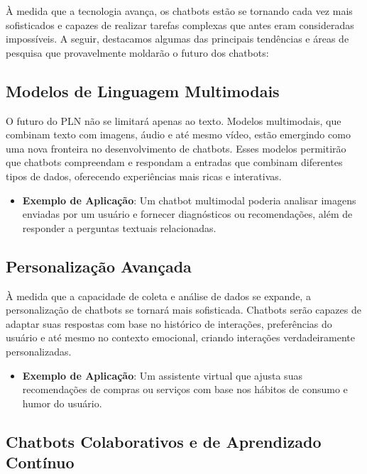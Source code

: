\documentclass[14pt,a4paper,oneside]{book}
\begin{document}
À medida que a tecnologia avança, os chatbots estão se tornando cada vez mais sofisticados e capazes de realizar tarefas complexas que antes eram consideradas impossíveis. A seguir, destacamos algumas das principais tendências e áreas de pesquisa que provavelmente moldarão o futuro dos chatbots:

\subsection{Modelos de Linguagem Multimodais}

O futuro do PLN não se limitará apenas ao texto. Modelos multimodais, que combinam texto com imagens, áudio e até mesmo vídeo, estão emergindo como uma nova fronteira no desenvolvimento de chatbots. Esses modelos permitirão que chatbots compreendam e respondam a entradas que combinam diferentes tipos de dados, oferecendo experiências mais ricas e interativas.

\begin{itemize}
	\item \textbf{Exemplo de Aplicação}: Um chatbot multimodal poderia analisar imagens enviadas por um usuário e fornecer diagnósticos ou recomendações, além de responder a perguntas textuais relacionadas.
\end{itemize}

\subsection{Personalização Avançada}

À medida que a capacidade de coleta e análise de dados se expande, a personalização de chatbots se tornará mais sofisticada. Chatbots serão capazes de adaptar suas respostas com base no histórico de interações, preferências do usuário e até mesmo no contexto emocional, criando interações verdadeiramente personalizadas.

\begin{itemize}
	\item \textbf{Exemplo de Aplicação}: Um assistente virtual que ajusta suas recomendações de compras ou serviços com base nos hábitos de consumo e humor do usuário.
\end{itemize}

\subsection{Chatbots Colaborativos e de Aprendizado Contínuo}
\end{document}
